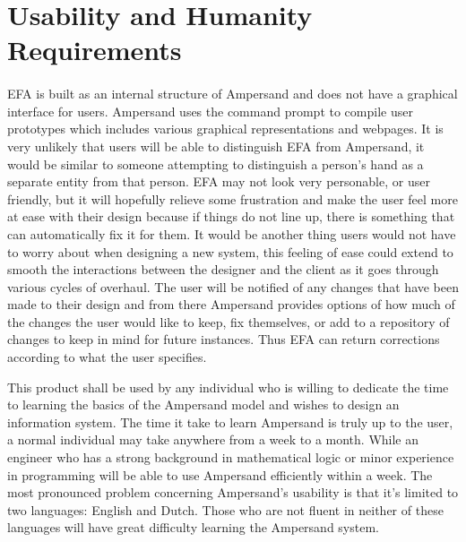 \documentclass[12pt]{report}
\begin{document}
\section{Usability and Humanity Requirements}\label{sec:Usability}
\paragraph*{}
EFA is built as an internal structure of Ampersand and does not have a graphical interface for 
users. Ampersand uses the command prompt to compile user prototypes which includes various 
graphical representations and webpages. It is very unlikely that users will be able to distinguish 
EFA from Ampersand, it would be similar to someone attempting to distinguish a person’s hand as 
a separate entity from that person. EFA may not look very personable, or user friendly, but it 
will hopefully relieve some frustration and make the user feel more at ease with their design 
because if things do not line up, there is something that can automatically fix it for them. It 
would be another thing users would not have to worry about when designing a new system, this 
feeling of ease could extend to smooth the interactions between the designer and the client as it 
goes through various cycles of overhaul. The user will be notified of any changes that have been 
made to their design and from there Ampersand provides options of how much of the changes the user 
would like to keep, fix themselves, or add to a repository of changes to keep in mind for future 
instances. Thus EFA can return corrections according to what the user specifies.

This product shall be used by any individual who is willing to dedicate the time to learning the 
basics of the Ampersand model and wishes to design an information system. The time it take to learn 
Ampersand is truly up to the user, a normal individual may take anywhere from a week to a month. 
While an engineer who has a strong background in mathematical logic or minor experience in 
programming will be able to use Ampersand efficiently within a week. The most pronounced problem 
concerning Ampersand’s usability is that it’s limited to two languages: English and Dutch. Those 
who are not fluent in neither of these languages will have great difficulty learning the Ampersand 
system.
\end{document}
